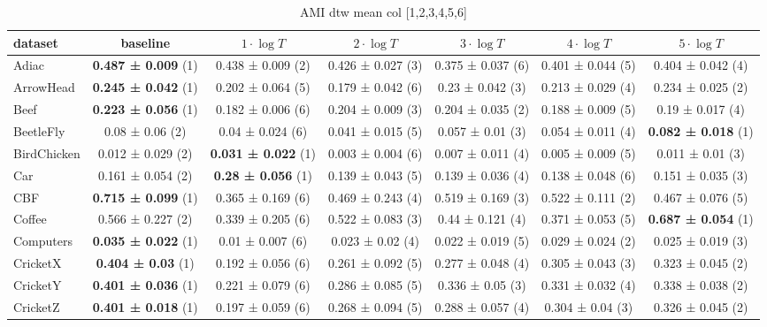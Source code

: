 \begin{table}[ht]
    \caption{AMI dtw mean col [1,2,3,4,5,6]} 
    \begin{adjustbox}{width=\textwidth}
    \begin{tabular}{lcccccc}
    \hline
    dataset & baseline & \textbf{$1\cdot \log{T}$} & \textbf{$2\cdot \log{T}$} & \textbf{$3\cdot \log{T}$} & \textbf{$4\cdot \log{T}$} & \textbf{$5\cdot \log{T}$} \\ \hline
    Adiac & \textbf{0.487 ± 0.009} (1) & 0.438 ± 0.009 (2) & 0.426 ± 0.027 (3) & 0.375 ± 0.037 (6) & 0.401 ± 0.044 (5) & 0.404 ± 0.042 (4) \\
    ArrowHead & \textbf{0.245 ± 0.042} (1) & 0.202 ± 0.064 (5) & 0.179 ± 0.042 (6) & 0.23 ± 0.042 (3) & 0.213 ± 0.029 (4) & 0.234 ± 0.025 (2) \\
    Beef & \textbf{0.223 ± 0.056} (1) & 0.182 ± 0.006 (6) & 0.204 ± 0.009 (3) & 0.204 ± 0.035 (2) & 0.188 ± 0.009 (5) & 0.19 ± 0.017 (4) \\
    BeetleFly & 0.08 ± 0.06 (2) & 0.04 ± 0.024 (6) & 0.041 ± 0.015 (5) & 0.057 ± 0.01 (3) & 0.054 ± 0.011 (4) & \textbf{0.082 ± 0.018} (1) \\
    BirdChicken & 0.012 ± 0.029 (2) & \textbf{0.031 ± 0.022} (1) & 0.003 ± 0.004 (6) & 0.007 ± 0.011 (4) & 0.005 ± 0.009 (5) & 0.011 ± 0.01 (3) \\
    Car & 0.161 ± 0.054 (2) & \textbf{0.28 ± 0.056} (1) & 0.139 ± 0.043 (5) & 0.139 ± 0.036 (4) & 0.138 ± 0.048 (6) & 0.151 ± 0.035 (3) \\
    CBF & \textbf{0.715 ± 0.099} (1) & 0.365 ± 0.169 (6) & 0.469 ± 0.243 (4) & 0.519 ± 0.169 (3) & 0.522 ± 0.111 (2) & 0.467 ± 0.076 (5) \\
    Coffee & 0.566 ± 0.227 (2) & 0.339 ± 0.205 (6) & 0.522 ± 0.083 (3) & 0.44 ± 0.121 (4) & 0.371 ± 0.053 (5) & \textbf{0.687 ± 0.054} (1) \\
    Computers & \textbf{0.035 ± 0.022} (1) & 0.01 ± 0.007 (6) & 0.023 ± 0.02 (4) & 0.022 ± 0.019 (5) & 0.029 ± 0.024 (2) & 0.025 ± 0.019 (3) \\
    CricketX & \textbf{0.404 ± 0.03} (1) & 0.192 ± 0.056 (6) & 0.261 ± 0.092 (5) & 0.277 ± 0.048 (4) & 0.305 ± 0.043 (3) & 0.323 ± 0.045 (2) \\
    CricketY & \textbf{0.401 ± 0.036} (1) & 0.221 ± 0.079 (6) & 0.286 ± 0.085 (5) & 0.336 ± 0.05 (3) & 0.331 ± 0.032 (4) & 0.338 ± 0.038 (2) \\
    CricketZ & \textbf{0.401 ± 0.018} (1) & 0.197 ± 0.059 (6) & 0.268 ± 0.094 (5) & 0.288 ± 0.057 (4) & 0.304 ± 0.04 (3) & 0.326 ± 0.045 (2) \\

\end{tabular}
\end{adjustbox}
\end{table}

